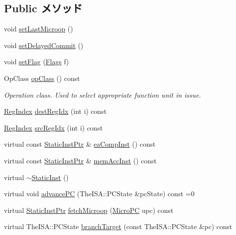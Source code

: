 \subsection*{Public メソッド}
\begin{DoxyCompactItemize}
\item 
void \hyperlink{classStaticInst_a1329ca2535b328d75f1cbedb80ec1e0e}{setLastMicroop} ()
\item 
void \hyperlink{classStaticInst_a962e50e6bada636e2fee41feb5650da8}{setDelayedCommit} ()
\item 
void \hyperlink{classStaticInst_a5e243c09e123ab8dacf60d9bf8b12283}{setFlag} (\hyperlink{classFlags}{Flags} f)
\item 
OpClass \hyperlink{classStaticInst_aa4919f97cae20d4d82391c1fc6d5fda6}{opClass} () const 
\begin{DoxyCompactList}\small\item\em Operation class. Used to select appropriate function unit in issue. \item\end{DoxyCompactList}\item 
\hyperlink{classStaticInst_a36d25e03e43fa3bb4c5482cbefe5e0fb}{RegIndex} \hyperlink{classStaticInst_ae5a1a6d72f40f715253b91e32b3caad2}{destRegIdx} (int i) const 
\item 
\hyperlink{classStaticInst_a36d25e03e43fa3bb4c5482cbefe5e0fb}{RegIndex} \hyperlink{classStaticInst_a9353aea3dfe673b88a4a96163d58759f}{srcRegIdx} (int i) const 
\item 
virtual const \hyperlink{classRefCountingPtr}{StaticInstPtr} \& \hyperlink{classStaticInst_ad814fb0b7773dc1fae7dffac00156583}{eaCompInst} () const 
\item 
virtual const \hyperlink{classRefCountingPtr}{StaticInstPtr} \& \hyperlink{classStaticInst_ad80579a806c548f2fc2ec4fd12236f36}{memAccInst} () const 
\item 
virtual \hyperlink{classStaticInst_ae03a0a2cb317b469b56cd94cf0a66f15}{$\sim$StaticInst} ()
\item 
virtual void \hyperlink{classStaticInst_afcd40c91dfbadd47b31d4ce2fc7fa777}{advancePC} (TheISA::PCState \&pcState) const =0
\item 
virtual \hyperlink{classRefCountingPtr}{StaticInstPtr} \hyperlink{classStaticInst_aa5c7e6f7323850b84dbf5b8e47856173}{fetchMicroop} (\hyperlink{base_2types_8hh_adfb4d8b20c5abc8be73dd367b16f2d57}{MicroPC} upc) const 
\item 
virtual TheISA::PCState \hyperlink{classStaticInst_af76ec8f94f2e86f19e751e75cc39acaa}{branchTarget} (const TheISA::PCState \&pc) const 

\end{DoxyCompactItemize}
